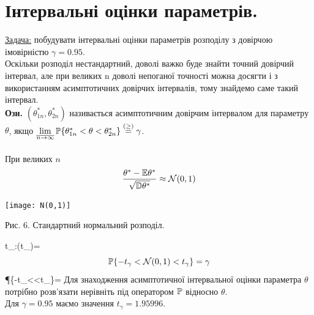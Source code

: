 \documentclass[14pt,a4paper]{scrartcl}
\begin{document}
\section{Інтервальні оцінки параметрів.}
\underline{Задача:} побудувати інтервальні оцінки параметрів розподілу з довірчою імовірністю $\gamma=0.95$.\\
Оскільки розподіл нестандартний, доволі важко буде знайти точний довірчий інтервал, але при великих n доволі непоганої точності можна досягти і з використанням асимптотичних довірчих інтервалів, тому знайдемо саме такий інтервал.\\
\textbf{Озн.} $(\theta^*_{1n},\theta^*_{2n})$ називається асимптотичним довірчим інтервалом для параметру $\theta$, якщо $\lim\limits_{\overline{n\to\infty}}{\P \{\theta^*_{1n}<\theta<\theta^*_{2n}\}} \stackrel{(\geq)}{=}\gamma$.\\
\\При великих $n$
$$\frac{\theta^*-\E\theta^*}{\sqrt{\D\theta^*}}\approx\N (0,1)$$
\begin{center}
  \texttt{[image: N(0,1)]}
  \caption{Рис. 6. Стандартний нормальний розподіл.}
\end{center}
\be t_\gamma:\Phi(t_\gamma)=\frac{}\ee
$$\P \{-t_\gamma<\N (0,1)<t_\gamma\}=\gamma$$
\be\P \{-t_\gamma<\frac{\theta^*-\E\theta^*}{\sqrt{\D\theta^*}}<t_\gamma\}=\gamma\ee
Для знаходження асимптотичної інтервальної оцінки параметра $\theta$ потрібно розв'язати нерівніть під оператором $\P $ відносно $\theta$.\\
Для $\gamma=0.95$ маємо значення $t_\gamma=1.95996$.
\end{document}
